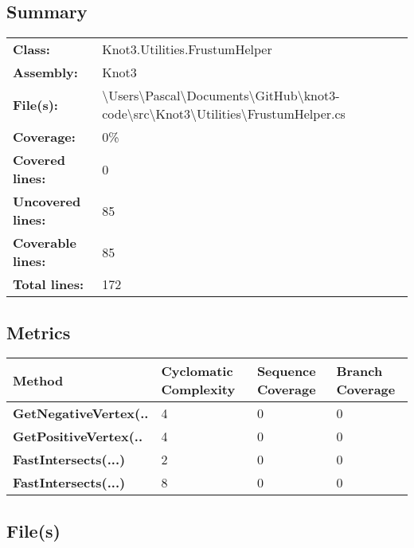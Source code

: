 \documentclass[a4paper,10pt]{article}
\begin{document}
\subsection{Summary}
\begin{longtable}[l]{ll}
\textbf{Class:} & Knot3.Utilities.FrustumHelper\\
\textbf{Assembly:} & Knot3\\
\textbf{File(s):} & \begin{minipage}[t]{12cm}{\textbackslash Users\textbackslash Pascal\textbackslash Documents\textbackslash GitHub\textbackslash knot3-code\textbackslash src\textbackslash Knot3\textbackslash Utilities\textbackslash FrustumHelper.cs}\end{minipage} \\
\textbf{Coverage:} & 0\%\\
\textbf{Covered lines:} & 0\\
\textbf{Uncovered lines:} & 85\\
\textbf{Coverable lines:} & 85\\
\textbf{Total lines:} & 172\\
\end{longtable}
\subsection{Metrics}
\begin{longtable}[l]{|l|l|l|l|}
\hline
\textbf{Method} & \textbf{Cyclomatic Complexity} & \textbf{Sequence Coverage} & \textbf{Branch Coverage}\\
\hline
\textbf{GetNegativeVertex(..} & 4 & 0 & 0\\
\hline
\textbf{GetPositiveVertex(..} & 4 & 0 & 0\\
\hline
\textbf{FastIntersects(...)} & 2 & 0 & 0\\
\hline
\textbf{FastIntersects(...)} & 8 & 0 & 0\\
\hline
\end{longtable}
\subsection{File(s)}
\end{document}
